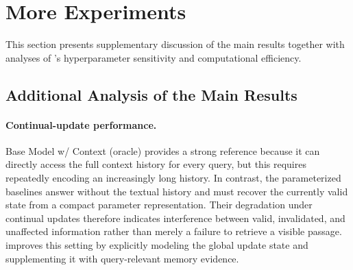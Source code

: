 \begin{table}[t]
\centering
\small
{}
\caption{\textbf{\method{}-specific and generation hyperparameters.} Memory units are constructed from context structure, so their number varies with the length and organization of each context.}
\label{tab:plume-implementation-settings}
\end{table}


\section{More Experiments}
\label{app:more-experiments}

This section presents supplementary discussion of the main results together
with analyses of \method{}'s hyperparameter sensitivity and computational
efficiency.

\subsection{Additional Analysis of the Main Results}
\label{app:additional-result-analysis}

\paragraph{Continual-update performance.}
Base Model w/ Context (oracle) provides a strong reference because it can directly
access the full context history for every query, but this requires repeatedly
encoding an increasingly long history. In contrast, the parameterized
baselines answer without the textual history and must recover the currently
valid state from a compact parameter representation. Their degradation under
continual updates therefore indicates interference between valid, invalidated,
and unaffected information rather than merely a failure to retrieve a visible
passage. \method{} improves this setting by explicitly modeling the global update
state and supplementing it with query-relevant memory evidence.

